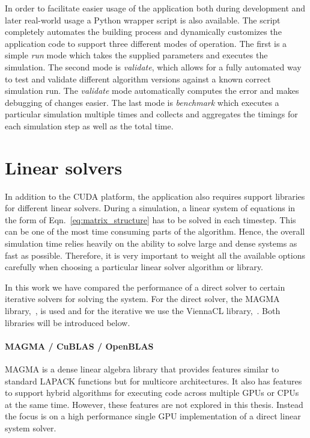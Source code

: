 In order to facilitate easier usage of the application both during development and later real-world usage a Python wrapper script is also available. The script completely automates the building process and dynamically customizes the application code to support three different modes of operation. The first is a simple \emph{run} mode which takes the supplied parameters and executes the simulation. The second mode is \emph{validate}, which allows for a fully automated way to test and validate different algorithm versions against a known correct simulation run. The \emph{validate} mode automatically computes the error and makes debugging of changes easier. The last mode is \emph{benchmark} which executes a particular simulation multiple times and collects and aggregates the timings for each simulation step as well as the total time.

\section{Linear solvers}
In addition to the CUDA platform, the application also requires support libraries for different linear solvers. During a simulation, a linear system of equations in the form of Eqn.~\eqref{eq:matrix_structure} has to be solved in each timestep. This can be one of the most time consuming parts of the algorithm. Hence, the overall simulation time relies heavily on the ability to solve large and dense systems as fast as possible. Therefore, it is very important to weight all the available options carefully when choosing a particular linear solver algorithm or library.

In this work we have compared the performance of a direct solver to certain iterative solvers for solving the system. For the direct solver, the MAGMA library,~\cite{MagmaDocumentation}, is used and for the iterative we use the ViennaCL library,~\cite{ViennaCLDocumentation}. Both libraries will be introduced below.

\paragraph{MAGMA / CuBLAS / OpenBLAS}
MAGMA is a dense linear algebra library that provides features similar to standard LAPACK functions but for multicore architectures. It also has features to support hybrid algorithms for executing code across multiple GPUs or CPUs at the same time. However, these features are not explored in this thesis. Instead the focus is on a high performance single GPU implementation of a direct linear system solver.

